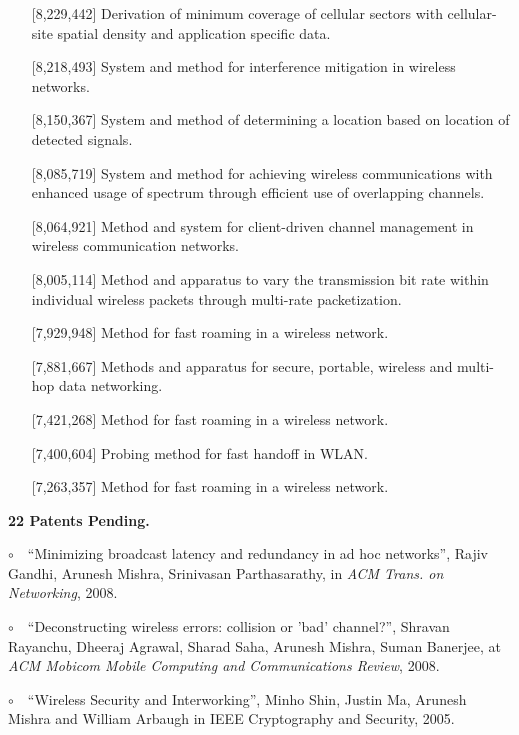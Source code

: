 \begin{resume}
\begin{itemize}
       \item [] [8,229,442] Derivation of minimum coverage of cellular sectors with cellular-site spatial density and
           application specific data.
       \item [] [8,218,493] System and method for interference mitigation in wireless networks.
       \item [] [8,150,367] System and method of determining a location based on location of detected signals.
       \item [] [8,085,719] System and method for achieving wireless communications with enhanced usage of spectrum
           through efficient use of overlapping channels.
       \item [] [8,064,921] Method and system for client-driven channel management in wireless communication networks.
       \item [] [8,005,114] Method and apparatus to vary the transmission bit rate within individual wireless packets
           through multi-rate packetization.
       \item [] [7,929,948] Method for fast roaming in a wireless network.
       \item [] [7,881,667] Methods and apparatus for secure, portable, wireless and multi-hop data networking.
       \item [] [7,421,268] Method for fast roaming in a wireless network.
       \item [] [7,400,604] Probing method for fast handoff in WLAN.
       \item [] [7,263,357] Method for fast roaming in a wireless network.
     \end{itemize}

{\bf 22 Patents Pending.}

\newcommand{\mybullet}{\noindent$\circ$~~}
\vspace{-0.7cm}

\mybullet ``Minimizing broadcast latency and redundancy in ad hoc networks'', Rajiv Gandhi, Arunesh Mishra, Srinivasan Parthasarathy, in
{\em ACM Trans. on Networking}, 2008.

\mybullet ``Deconstructing wireless errors: collision or 'bad' channel?'', Shravan  Rayanchu, Dheeraj Agrawal, Sharad Saha, Arunesh Mishra, Suman Banerjee,
at {\em ACM Mobicom Mobile Computing and Communications Review}, 2008.

\mybullet ``Wireless Security and Interworking'', Minho Shin, Justin Ma, Arunesh Mishra and William Arbaugh in IEEE Cryptography and Security, 2005.


\end{resume}
